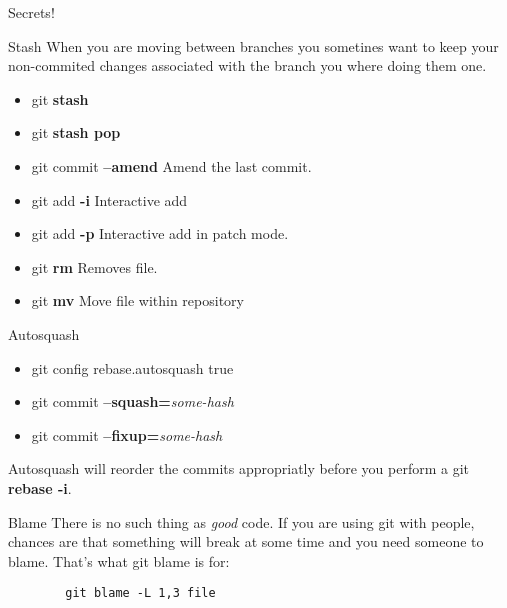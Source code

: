 \documentclass{beamer}
\begin{document}
\begin{frame}{Secrets!}
 \begin{block}{Stash}
    When you are moving between branches you sometines want to keep your non-commited changes associated with the branch you where doing them one.
    \begin{itemize}
      \item git \textbf{stash}
      \item git \textbf{stash pop}
    \end{itemize}
  \end{block}

  \begin{itemize}
    \item git commit \textbf{--amend} Amend the last commit.
    \item git add \textbf{-i} Interactive add
    \item git add \textbf{-p} Interactive add in patch mode.
    \item git \textbf{rm} Removes file.
    \item git \textbf{mv} Move file within repository
  \end{itemize}
  
  \framebreak
    
  \begin{block}{Autosquash}
    \begin{itemize}
      \item git config rebase.autosquash true
      \item git commit \textbf{--squash=}\emph{some-hash}
      \item git commit \textbf{--fixup=}\emph{some-hash}
     \end{itemize}
     Autosquash will reorder the commits appropriatly before you perform a git \textbf{rebase -i}.
  \end{block}
  \begin{block}{Blame}
    There is no such thing as \textit{good} code. If you are using git with people, chances are that something will break at some time and you need someone to blame. That's what git blame is for:
    \begin{lstlisting}
        git blame -L 1,3 file
    \end{lstlisting}
  \end{block}
\end{frame}
\end{document}

